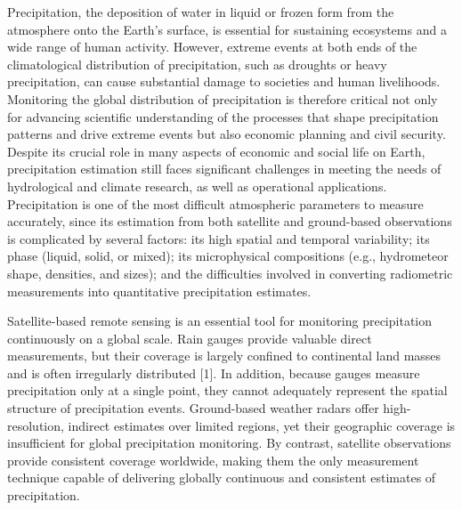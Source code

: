 \documentclass[11pt]{article}
\begin{document}
Precipitation, the deposition of water in liquid or frozen form from the
atmosphere onto the Earth's surface, is essential for sustaining ecosystems and
a wide range of human activity. However, extreme events at both ends of the
climatological distribution of precipitation, such as droughts or heavy
precipitation, can cause substantial damage to societies and human livelihoods.
Monitoring the global distribution of precipitation is therefore critical not
only for advancing scientific understanding of the processes that shape
precipitation patterns and drive extreme events but also economic planning and
civil security. Despite its crucial role in many aspects of economic and social
life on Earth, precipitation estimation still faces significant challenges in
meeting the needs of hydrological and climate research, as well as operational
applications. Precipitation is one of the most difficult atmospheric parameters
to measure accurately, since its estimation from both satellite and ground-based
observations is complicated by several factors: its high spatial and temporal
variability; its phase (liquid, solid, or mixed); its microphysical compositions
(e.g., hydrometeor shape, densities, and sizes); and the difficulties involved
in converting radiometric measurements into quantitative precipitation
estimates.

Satellite-based remote sensing is an essential tool for monitoring precipitation
continuously on a global scale. Rain gauges provide valuable direct
measurements, but their coverage is largely confined to continental land masses
and is often irregularly distributed [1]. In addition, because gauges measure
precipitation only at a single point, they cannot adequately represent the
spatial structure of precipitation events. Ground-based weather radars offer
high-resolution, indirect estimates over limited regions, yet their geographic
coverage is insufficient for global precipitation monitoring. By contrast,
satellite observations provide consistent coverage worldwide, making them the
only measurement technique capable of delivering globally continuous and
consistent estimates of precipitation.
\end{document}
